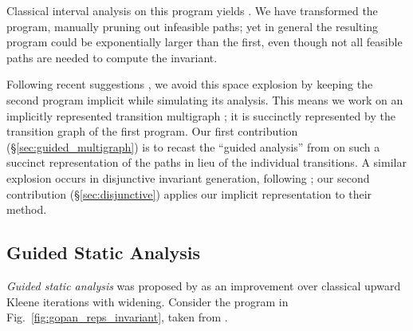 \begin{minipage}[c]{9cm}

\end{minipage}
\begin{minipage}[c]{2cm}
\end{minipage}

Classical interval analysis on this program yields .
We have transformed the program, manually pruning out infeasible paths; yet in general the resulting program could be exponentially larger than the first, even though not all feasible paths are needed to compute the invariant.

Following recent suggestions \cite{Gawlitza_Monniaux_ESOP11,Monniaux_Gonnord_SAS11}, we avoid this space explosion by keeping the second program implicit while simulating its analysis. This means we work on an implicitly represented transition multigraph ; it is succinctly represented by the transition graph of the first program.
Our first contribution (\S\ref{sec:guided_multigraph}) is to recast the ``guided analysis'' from \cite{DBLP:conf/sas/GopanR07} on such a succinct representation of the paths in lieu of the individual transitions.
A similar explosion occurs in disjunctive invariant generation, following \cite{DBLP:conf/pldi/GulwaniZ10}; our second contribution (\S\ref{sec:disjunctive}) applies our implicit representation to their method.


\subsection{Guided Static Analysis}
\label{sec:guided}
\emph{Guided static analysis} was proposed by \cite{DBLP:conf/sas/GopanR07} as an improvement over classical upward Kleene iterations with widening.
Consider the program in Fig.~\ref{fig:gopan_reps_invariant}, taken from \cite{DBLP:conf/sas/GopanR07}.

